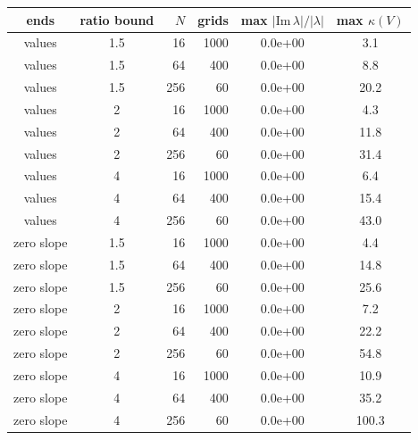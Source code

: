 \begin{tabular}{cc r r cc}
\toprule
ends & ratio bound & $N$ & grids & max $|\mathrm{Im}\,\lambda|/|\lambda|$ & max $\kappa(V)$\\
\midrule
values & 1.5 & 16 & 1000 & 0.0e+00 & 3.1\\
values & 1.5 & 64 & 400 & 0.0e+00 & 8.8\\
values & 1.5 & 256 & 60 & 0.0e+00 & 20.2\\
values & 2 & 16 & 1000 & 0.0e+00 & 4.3\\
values & 2 & 64 & 400 & 0.0e+00 & 11.8\\
values & 2 & 256 & 60 & 0.0e+00 & 31.4\\
values & 4 & 16 & 1000 & 0.0e+00 & 6.4\\
values & 4 & 64 & 400 & 0.0e+00 & 15.4\\
values & 4 & 256 & 60 & 0.0e+00 & 43.0\\
zero slope & 1.5 & 16 & 1000 & 0.0e+00 & 4.4\\
zero slope & 1.5 & 64 & 400 & 0.0e+00 & 14.8\\
zero slope & 1.5 & 256 & 60 & 0.0e+00 & 25.6\\
zero slope & 2 & 16 & 1000 & 0.0e+00 & 7.2\\
zero slope & 2 & 64 & 400 & 0.0e+00 & 22.2\\
zero slope & 2 & 256 & 60 & 0.0e+00 & 54.8\\
zero slope & 4 & 16 & 1000 & 0.0e+00 & 10.9\\
zero slope & 4 & 64 & 400 & 0.0e+00 & 35.2\\
zero slope & 4 & 256 & 60 & 0.0e+00 & 100.3\\
\bottomrule
\end{tabular}
